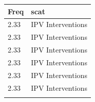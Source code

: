 \documentclass[]{tufte-handout}
\begin{document}
\begin{longtable}[]{@{}ll@{}}
\toprule
\begin{minipage}[b]{0.09\columnwidth}\raggedright\strut
Freq\strut
\end{minipage} & \begin{minipage}[b]{0.26\columnwidth}\raggedright\strut
scat\strut
\end{minipage}\tabularnewline
\midrule
\endhead
\begin{minipage}[t]{0.09\columnwidth}\raggedright\strut
2.33\strut
\end{minipage} & \begin{minipage}[t]{0.26\columnwidth}\raggedright\strut
IPV Interventions\strut
\end{minipage}\tabularnewline
\begin{minipage}[t]{0.09\columnwidth}\raggedright\strut
2.33\strut
\end{minipage} & \begin{minipage}[t]{0.26\columnwidth}\raggedright\strut
IPV Interventions\strut
\end{minipage}\tabularnewline
\begin{minipage}[t]{0.09\columnwidth}\raggedright\strut
2.33\strut
\end{minipage} & \begin{minipage}[t]{0.26\columnwidth}\raggedright\strut
IPV Interventions\strut
\end{minipage}\tabularnewline
\begin{minipage}[t]{0.09\columnwidth}\raggedright\strut
2.33\strut
\end{minipage} & \begin{minipage}[t]{0.26\columnwidth}\raggedright\strut
IPV Interventions\strut
\end{minipage}\tabularnewline
\begin{minipage}[t]{0.09\columnwidth}\raggedright\strut
2.33\strut
\end{minipage} & \begin{minipage}[t]{0.26\columnwidth}\raggedright\strut
IPV Interventions\strut
\end{minipage}\tabularnewline
\begin{minipage}[t]{0.09\columnwidth}\raggedright\strut
2.33\strut
\end{minipage} & \begin{minipage}[t]{0.26\columnwidth}\raggedright\strut
IPV Interventions\strut
\end{minipage}\tabularnewline
\begin{minipage}[t]{0.09\columnwidth}\raggedright\strut

\end{minipage}
\end{longtable}
\end{document}
